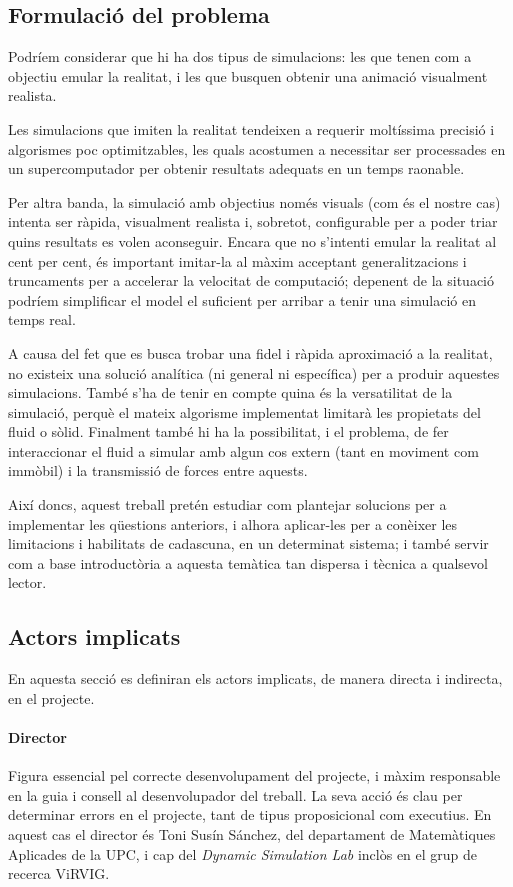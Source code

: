 \documentclass[a4paper]{report}
\begin{document}
	\subsection{Formulació del problema}
	Podríem considerar que hi ha dos tipus de simulacions: les que tenen com a objectiu emular la realitat, i les que busquen obtenir una animació visualment realista.\par
	Les simulacions que imiten la realitat tendeixen a requerir moltíssima precisió i algorismes poc optimitzables, les quals acostumen a necessitar ser processades en un supercomputador per obtenir resultats adequats en un temps raonable. \par
	Per altra banda, la simulació amb objectius només visuals (com és el nostre cas) intenta ser ràpida, visualment realista i, sobretot, configurable per a poder triar quins resultats es volen aconseguir. Encara que no s'intenti emular la realitat al cent per cent, és important imitar-la al màxim acceptant generalitzacions i truncaments per a accelerar la velocitat de computació; depenent de la situació podríem simplificar el model el suficient per arribar a tenir una simulació en temps real.\par
	A causa del fet que es busca trobar una fidel i ràpida aproximació a la realitat, no existeix una solució analítica (ni general ni específica) per a produir aquestes simulacions. També s'ha de tenir en compte quina és la versatilitat de la simulació, perquè el mateix algorisme implementat limitarà les propietats del fluid o sòlid. Finalment també hi ha la possibilitat, i el problema, de fer interaccionar el fluid a simular amb algun cos extern (tant en moviment com immòbil) i la transmissió de forces entre aquests. \par
	Així doncs, aquest treball pretén estudiar com plantejar solucions per a implementar les qüestions anteriors, i alhora aplicar-les per a conèixer les limitacions i habilitats de cadascuna, en un determinat sistema; i també servir com a base introductòria a aquesta temàtica tan dispersa i tècnica a qualsevol lector.
	
	\subsection{Actors implicats}
	En aquesta secció es definiran els actors implicats, de manera directa i indirecta, en el projecte.
	\paragraph{\quad Director} Figura essencial pel correcte desenvolupament del projecte, i màxim responsable en la guia i consell al desenvolupador del treball. La seva acció és clau per determinar errors en el projecte, tant de tipus proposicional com executius. En aquest cas el director és Toni Susín Sánchez, del departament de Matemàtiques Aplicades de la UPC, i cap del \textit{Dynamic Simulation Lab} inclòs en el grup de recerca ViRVIG.
\end{document}
